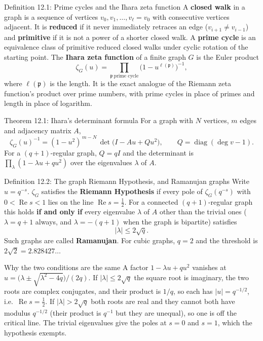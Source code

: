 \documentclass[11pt]{article}
\begin{document}
\begin{defbox}{Definition 12.1: Prime cycles and the Ihara zeta function}
A \textbf{closed walk} in a graph is a sequence of vertices $v_0,v_1,\dots,v_\ell=v_0$ with consecutive vertices adjacent. It is \textbf{reduced} if it never immediately retraces an edge ($v_{i+1}\ne v_{i-1}$) and \textbf{primitive} if it is not a power of a shorter closed walk. A \textbf{prime cycle} is an equivalence class of primitive reduced closed walks under cyclic rotation of the starting point. The \textbf{Ihara zeta function} of a finite graph $G$ is the Euler product
\begin{equation}
  \zeta_G(u)=\prod_{\mathfrak p\ \text{prime cycle}}\bigl(1-u^{\ell(\mathfrak p)}\bigr)^{-1},
\end{equation}
where $\ell(\mathfrak p)$ is the length. It is the exact analogue of the Riemann zeta function's product over prime numbers, with prime cycles in place of primes and length in place of logarithm.
\end{defbox}

\begin{thmbox}{Theorem 12.1: Ihara's determinant formula}
For a graph with $N$ vertices, $m$ edges and adjacency matrix $A$,
\begin{equation}
  \zeta_G(u)^{-1}=(1-u^2)^{\,m-N}\,\det\bigl(I-Au+Qu^2\bigr),\qquad Q=\operatorname{diag}(\deg v-1).
\end{equation}
For a $(q+1)$-regular graph, $Q=qI$ and the determinant is $\prod_\lambda(1-\lambda u+qu^2)$ over the eigenvalues $\lambda$ of $A$.
\end{thmbox}

\begin{defbox}{Definition 12.2: The graph Riemann Hypothesis, and Ramanujan graphs}
Write $u=q^{-s}$. $\zeta_G$ satisfies the \textbf{Riemann Hypothesis} if every pole of $\zeta_G(q^{-s})$ with $0<\operatorname{Re}s<1$ lies on the line $\operatorname{Re}s=\tfrac12$. For a connected $(q+1)$-regular graph this holds \textbf{if and only if} every eigenvalue $\lambda$ of $A$ other than the trivial ones ($\lambda=q+1$ always, and $\lambda=-(q+1)$ when the graph is bipartite) satisfies
\begin{equation}
  |\lambda|\le2\sqrt q .
\end{equation}
Such graphs are called \textbf{Ramanujan}. For cubic graphs, $q=2$ and the threshold is $2\sqrt2=2.828427\ldots$
\end{defbox}

\begin{defbox}{Why the two conditions are the same}
A factor $1-\lambda u+qu^2$ vanishes at $u=\bigl(\lambda\pm\sqrt{\lambda^2-4q}\bigr)/(2q)$. If $|\lambda|\le2\sqrt q$ the square root is imaginary, the two roots are complex conjugates, and their product is $1/q$, so each has $|u|=q^{-1/2}$, i.e.\ $\operatorname{Re}s=\tfrac12$. If $|\lambda|>2\sqrt q$ both roots are real and they cannot both have modulus $q^{-1/2}$ (their product is $q^{-1}$ but they are unequal), so one is off the critical line. The trivial eigenvalues give the poles at $s=0$ and $s=1$, which the hypothesis exempts.
\end{defbox}
\end{document}
